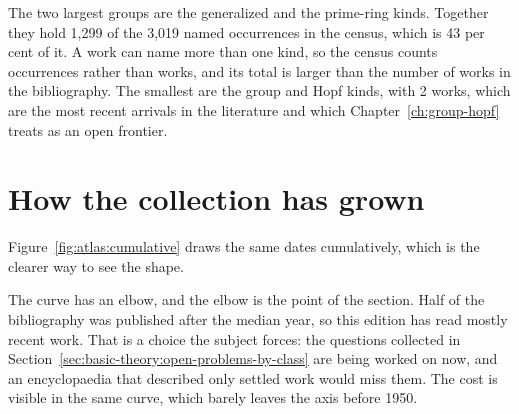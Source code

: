 The two largest groups are the generalized and the prime-ring kinds. %
Together they hold 1,299 of the 3,019 named occurrences in the census, which is %
43 per cent of it. %
A work can name more than one kind, so the census counts occurrences rather %
than works, and its total is larger than the number of works in the %
bibliography. %
The smallest are the group and Hopf kinds, with 2 works, which are the most %
recent arrivals in the literature and which Chapter~\ref{ch:group-hopf} treats %
as an open frontier. %

\section{How the collection has grown}

Figure~\ref{fig:atlas:cumulative} draws the same dates cumulatively, which is %
the clearer way to see the shape. %


The curve has an elbow, and the elbow is the point of the section. Half of the %
bibliography was published after the median year, so this edition has read %
mostly recent work. That is a choice the subject forces: the questions collected in %
Section~\ref{sec:basic-theory:open-problems-by-class} are being worked on now, and an %
encyclopaedia that described only settled work would miss them. The cost is visible in the same %
curve, which barely leaves the axis before 1950. %

